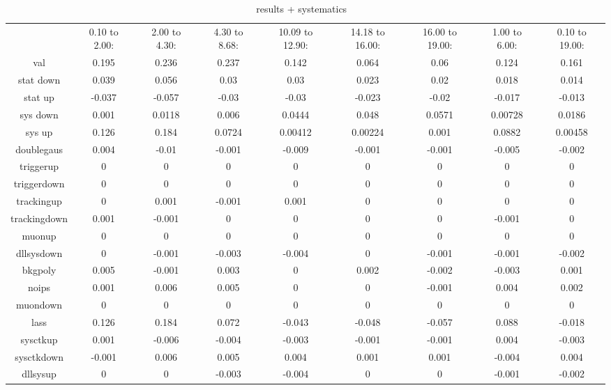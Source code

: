 {\begin{table}[tbp]
\caption{ \FS results + systematics ~\label{tbl:swave:meas:fs:results} }
\begin{tabular}{|c|c|c|c|c|c|c|c|c|}
\hline
 & 0.10 to  2.00: & 2.00 to  4.30: & 4.30 to  8.68: & 10.09 to  12.90: & 14.18 to  16.00: & 16.00 to  19.00: & 1.00 to  6.00: & 0.10 to  19.00:\\ 
val & 0.195 & 0.236 & 0.237 & 0.142 & 0.064 & 0.06 & 0.124 & 0.161\\ 
stat down & 0.039 & 0.056 & 0.03 & 0.03 & 0.023 & 0.02 & 0.018 & 0.014\\ 
stat up & -0.037 & -0.057 & -0.03 & -0.03 & -0.023 & -0.02 & -0.017 & -0.013\\ 
sys down & 0.001 & 0.0118 & 0.006 & 0.0444 & 0.048 & 0.0571 & 0.00728 & 0.0186\\ 
sys up & 0.126 & 0.184 & 0.0724 & 0.00412 & 0.00224 & 0.001 & 0.0882 & 0.00458\\ 
doublegaus & 0.004 & -0.01 & -0.001 & -0.009 & -0.001 & -0.001 & -0.005 & -0.002\\ 
triggerup & 0 & 0 & 0 & 0 & 0 & 0 & 0 & 0\\ 
triggerdown & 0 & 0 & 0 & 0 & 0 & 0 & 0 & 0\\ 
trackingup & 0 & 0.001 & -0.001 & 0.001 & 0 & 0 & 0 & 0\\ 
trackingdown & 0.001 & -0.001 & 0 & 0 & 0 & 0 & -0.001 & 0\\ 
muonup & 0 & 0 & 0 & 0 & 0 & 0 & 0 & 0\\ 
dllsysdown & 0 & -0.001 & -0.003 & -0.004 & 0 & -0.001 & -0.001 & -0.002\\ 
bkgpoly & 0.005 & -0.001 & 0.003 & 0 & 0.002 & -0.002 & -0.003 & 0.001\\ 
noips & 0.001 & 0.006 & 0.005 & 0 & 0 & -0.001 & 0.004 & 0.002\\ 
muondown & 0 & 0 & 0 & 0 & 0 & 0 & 0 & 0\\ 
lass & 0.126 & 0.184 & 0.072 & -0.043 & -0.048 & -0.057 & 0.088 & -0.018\\ 
sysctkup & 0.001 & -0.006 & -0.004 & -0.003 & -0.001 & -0.001 & 0.004 & -0.003\\ 
sysctkdown & -0.001 & 0.006 & 0.005 & 0.004 & 0.001 & 0.001 & -0.004 & 0.004\\ 
dllsysup & 0 & 0 & -0.003 & -0.004 & 0 & 0 & -0.001 & -0.002\\ 
\hline
\end{tabular}
\end{table}




}
